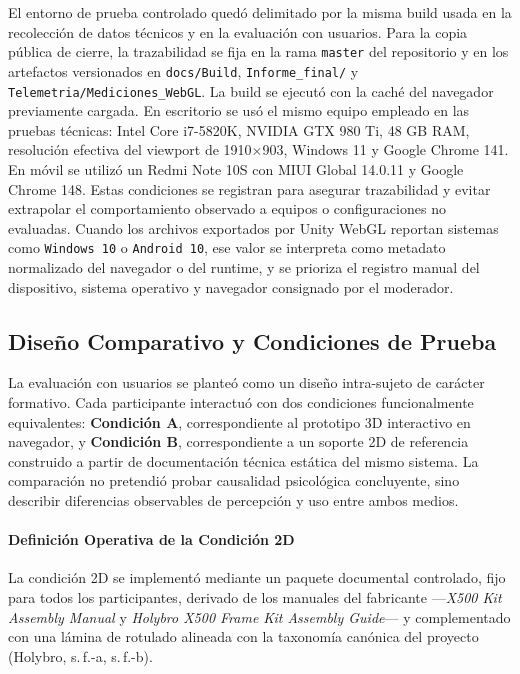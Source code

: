 El entorno de prueba controlado quedó delimitado por la misma build usada en la recolección de datos técnicos y en la evaluación con usuarios. Para la copia pública de cierre, la trazabilidad se fija en la rama \texttt{master} del repositorio y en los artefactos versionados en \texttt{docs/Build}, \texttt{Informe\_final/} y \texttt{Telemetria/Mediciones\_WebGL}. La build se ejecutó con la caché del navegador previamente cargada. En escritorio se usó el mismo equipo empleado en las pruebas técnicas: Intel Core i7-5820K, NVIDIA GTX 980 Ti, 48 GB RAM, resolución efectiva del viewport de 1910\(\times\)903, Windows 11 y Google Chrome 141. En móvil se utilizó un Redmi Note 10S con MIUI Global 14.0.11 y Google Chrome 148. Estas condiciones se registran para asegurar trazabilidad y evitar extrapolar el comportamiento observado a equipos o configuraciones no evaluadas. Cuando los archivos exportados por Unity WebGL reportan sistemas como \texttt{Windows 10} o \texttt{Android 10}, ese valor se interpreta como metadato normalizado del navegador o del runtime, y se prioriza el registro manual del dispositivo, sistema operativo y navegador consignado por el moderador.

\subsection{Diseño Comparativo y Condiciones de Prueba}

La evaluación con usuarios se planteó como un diseño intra-sujeto de carácter formativo. Cada participante interactuó con dos condiciones funcionalmente equivalentes: \textbf{Condición A}, correspondiente al prototipo 3D interactivo en navegador, y \textbf{Condición B}, correspondiente a un soporte 2D de referencia construido a partir de documentación técnica estática del mismo sistema. La comparación no pretendió probar causalidad psicológica concluyente, sino describir diferencias observables de percepción y uso entre ambos medios.

\paragraph{Definición Operativa de la Condición 2D} La condición 2D se implementó mediante un paquete documental controlado, fijo para todos los participantes, derivado de los manuales del fabricante ---\textit{X500 Kit Assembly Manual} y \textit{Holybro X500 Frame Kit Assembly Guide}--- y complementado con una lámina de rotulado alineada con la taxonomía canónica del proyecto (Holybro, s.\,f.-a, s.\,f.-b).

